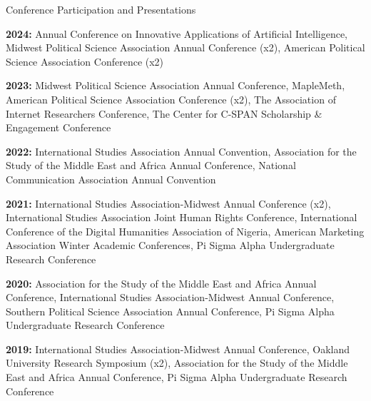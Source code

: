 \documentclass{resume} %
\begin{document}
\begin{rSection}{Conference Participation and Presentations}

\textbf{2024:} Annual Conference on Innovative Applications of Artificial Intelligence, Midwest Political Science Association Annual Conference (x2), American Political Science Association Conference (x2) \vspace{2mm}

\textbf{2023:} Midwest Political Science Association Annual Conference, MapleMeth, American Political Science Association Conference (x2), The Association of Internet Researchers Conference, The Center for C-SPAN Scholarship \& Engagement Conference \vspace{2mm}

\textbf{2022:} International Studies Association Annual Convention, Association for the Study of the Middle East and Africa Annual Conference, National Communication Association Annual Convention \vspace{2mm}

\textbf{2021:} International Studies Association-Midwest Annual Conference (x2), International Studies Association Joint Human Rights Conference, International Conference of the Digital Humanities Association of Nigeria, American Marketing Association Winter Academic Conferences, Pi Sigma Alpha Undergraduate Research Conference \vspace{2mm}

\textbf{2020:} Association for the Study of the Middle East and Africa Annual Conference, International Studies Association-Midwest Annual Conference, Southern Political Science Association Annual Conference, Pi Sigma Alpha Undergraduate Research Conference 

\textbf{2019:} International Studies Association-Midwest Annual Conference, Oakland University Research Symposium (x2), Association for the Study of the Middle East and Africa Annual Conference, Pi Sigma Alpha Undergraduate Research Conference



\end{rSection}
\end{document}
